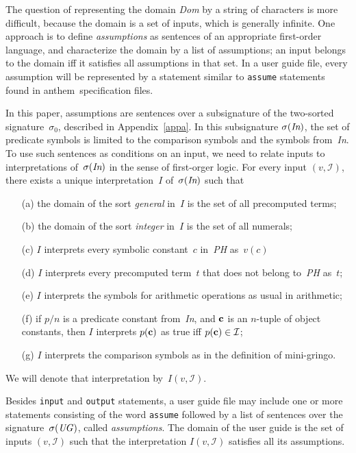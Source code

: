 \documentclass{article}
\def\gringo{{\sc gringo}}
\def\anthem{{\sc anthem}}
\newcommand{\I}{\mathcal{I}}
\begin{document}
The question of representing the domain \emph{Dom} by a string of
characters is more difficult, because the domain is a set of inputs,
which is generally infinite.
One approach is to define \emph{assumptions} as sentences of an
appropriate first-order language, and characterize the domain by a
list of assumptions; an input belongs to the domain iff it
satisfies all assumptions in that set.  In a user guide file, every
assumption will be represented by a statement similar to \verb|assume|
statements found in \anthem\ specification files.

In this paper, assumptions are sentences over a subsignature of the
two-sorted signature~$\sigma_0$, described in Appendix~\ref{appa}.
In this subsignature $\sigma(\emph{In})$, the set of predicate
symbols is limited to the comparison symbols and the symbols from~\emph{In}.
To use such sentences as conditions
on an input, we need to relate inputs to interpretations of~$\sigma(\emph{In})$
in the sense of first-orger logic.  For every input $(v,\I)$, there
exists a unique interpretation~$I$ of~$\sigma(\emph{In})$ such that
\begin{itemize}
\item[(a)]
the domain of the sort \emph{general} in~$I$
  is the set of all precomputed terms;
\item[(b)]
the domain of the sort \emph{integer} in~$I$ is the set of all numerals;
\item[(c)] $I$ interprets every symbolic constant~$c$ in~\emph{PH}
  as~$v(c)$
\item[(d)] $I$ interprets every precomputed term~$t$ that does not
  belong to~\emph{PH} as~$t$;
\item[(e)] $I$ interprets the symbols for arithmetic operations
  as usual in arithmetic;
\item[(f)] if $p/n$ is a predicate constant from~\emph{In}, and $\bf c$
  is an $n$-tuple of object constants, then $I$ interprets
  $p({\bf c})$ as true iff $p({\bf c})\in\I$;
\item[(g)] $I$ interprets the comparison symbols as in the definition of
  mini-\gringo.
\end{itemize}
We will denote that interpretation by~$I(v,\I)$.

Besides \verb|input| and \verb|output| statements, a user guide
file may include one or more statements consisting of the word
\verb|assume| followed by a list of sentences over the
signature~$\sigma(\emph{UG\/})$, called \emph{assumptions}.
The domain of the user guide is the set of inputs $(v,\I)$ such that
the interpretation $I(v,\I)$ satisfies all its assumptions.
\end{document}
